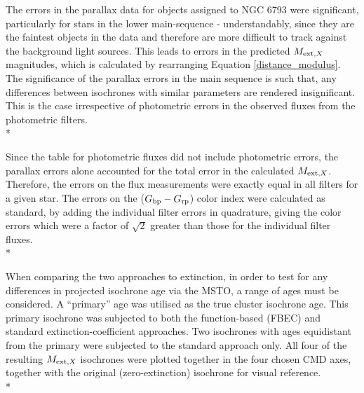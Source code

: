 \documentclass[12pt, a4paper]{report}
\begin{document}
The errors in the parallax data for objects assigned to NGC 6793 were significant, particularly for stars in the lower main-sequence - understandably, since they are the faintest objects in the data and therefore are more difficult to track against the background light sources. This leads to errors in the predicted $M_{\textnormal{ext},X}$ magnitudes, which is calculated by rearranging Equation \ref{distance_modulus}. The significance of the parallax errors in the main sequence is such that, any differences between isochrones with similar parameters are rendered insignificant. This is the case irrespective of photometric errors in the observed fluxes from the photometric filters.\\*

Since the table for photometric fluxes did not include photometric errors, the parallax errors alone accounted for the total error in the calculated $M_{\textnormal{ext},X}$. Therefore, the errors on the flux measurements  were exactly equal in all filters for a given star. The errors on the ($G_{\textnormal{bp}}-G_{\textnormal{rp}}$) color index were calculated as standard, by adding the individual filter errors in quadrature, giving the color errors which were a factor of $\sqrt{2}$ greater than those for the individual filter fluxes.\\*

When comparing the two approaches to extinction, in order to test for any differences in projected isochrone age via the MSTO, a range of ages must be considered. A ``primary'' age was utilised as the true cluster isochrone age. This primary isochrone was subjected to both the function-based (FBEC) and standard extinction-coefficient approaches. Two isochrones with ages equidistant from the primary were subjected to the standard approach only. All four of the resulting $M_{\textnormal{ext},X}$ isochrones were plotted together in the four chosen CMD axes, together with the original (zero-extinction) isochrone for visual reference.\\*
\end{document}

